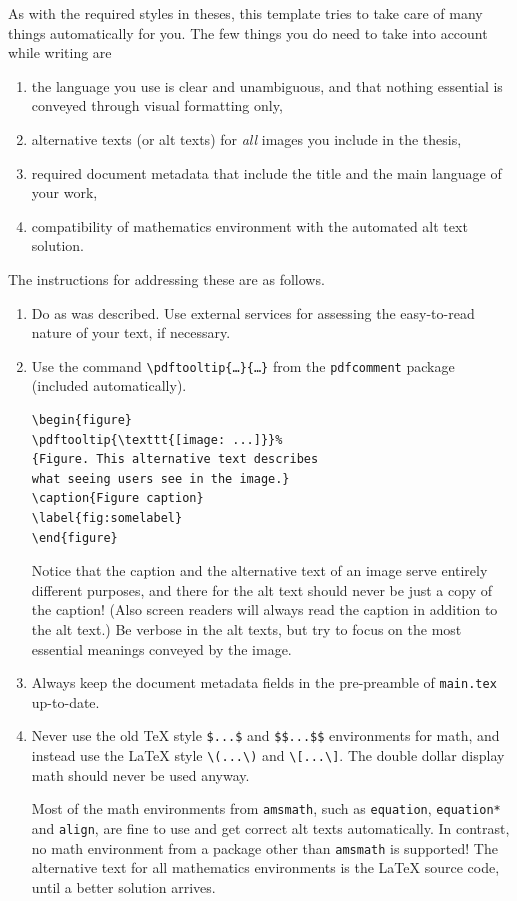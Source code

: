 As with the required styles in theses, this template tries to take care of many things automatically for you. The few things you do need to take into account while writing are
\begin{enumerate}
\item the language you use is clear and unambiguous, and that nothing essential is conveyed through visual formatting only,
\item alternative texts (or alt texts) for \emph{all} images you include in the thesis,
\item required document metadata that include the title and the main language of your work,
\item compatibility of mathematics environment with the automated alt text solution.
\end{enumerate}
The instructions for addressing these are as follows.
\begin{enumerate}
\item Do as was described. Use external services for assessing the easy-to-read nature of your text, if necessary.
\item Use the command \texttt{\textbackslash pdftooltip\{\ldots\}\{\ldots\}} from the \texttt{pdfcomment} package (included automatically).
\begin{verbatim}
\begin{figure}
\pdftooltip{\texttt{[image: ...]}}%
{Figure. This alternative text describes
what seeing users see in the image.}
\caption{Figure caption}
\label{fig:somelabel}
\end{figure}
\end{verbatim}
Notice that the caption and the alternative text of an image serve entirely different purposes, and there for the alt text should never be just a copy of the caption! (Also screen readers will always read the caption in addition to the alt text.) Be verbose in the alt texts, but try to focus on the most essential meanings conveyed by the image.
\item Always keep the document metadata fields in the pre-preamble of \texttt{main.tex} up-to-date.
\item Never use the old \TeX{} style \verb+$...$+ and \verb+$$...$$+ environments for math, and instead use the \LaTeX{} style \verb+\(...\)+ and \verb+\[...\]+. The double dollar display math should never be used anyway.

Most of the math environments from \texttt{amsmath}, such as \texttt{equation}, \texttt{equation*} and \texttt{align}, are fine to use and get correct alt texts automatically. In contrast, no math environment from a package other than \texttt{amsmath} is supported! The alternative text for all mathematics environments is the \LaTeX{} source code, until a better solution arrives.
\end{enumerate}
